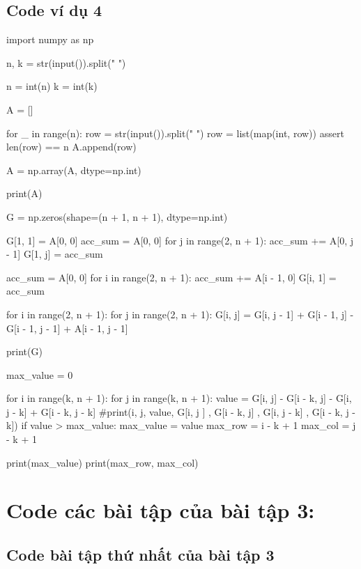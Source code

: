 \documentclass[14pt, a4paper]{article}
\theoremstyle{sltheorem}
\theoremstyle{soltheorem}
\begin{document}
    \subsection{Code ví dụ 4} \label{code-4-ex-2}

    \begin{python}
import numpy as np
        
n, k = str(input()).split(" ")
                    
n = int(n)
k = int(k)
                    
A = []
                    
for _ in range(n):
    row = str(input()).split(" ")
    row = list(map(int, row))
    assert len(row) == n
    A.append(row)
                    
A = np.array(A, dtype=np.int)
                    
print(A)
                    
G = np.zeros(shape=(n + 1, n + 1), dtype=np.int)
                    
G[1, 1] = A[0, 0]
acc_sum = A[0, 0]
for j in range(2, n + 1):
    acc_sum += A[0, j - 1]
    G[1, j] = acc_sum
                    
acc_sum = A[0, 0]
for i in range(2, n + 1):
    acc_sum += A[i - 1, 0]
    G[i, 1] = acc_sum
                    
for i in range(2, n + 1):
    for j in range(2, n + 1):
        G[i, j] = G[i, j - 1] + G[i - 1, j] - G[i - 1, j - 1] + A[i - 1, j - 1]
                    
                    
print(G)
                    
max_value = 0
                    
for i in range(k, n + 1):
    for j in range(k, n + 1):
        value = G[i, j] - G[i - k, j] - G[i, j - k] + G[i - k, j - k]
        #print(i, j, value, G[i, j ] , G[i - k, j] , G[i, j - k] , G[i - k, j - k])
        if value > max_value:
            max_value = value
            max_row = i - k + 1
            max_col = j - k + 1
                    
print(max_value)
print(max_row, max_col)
        \end{python}

\section{Code các bài tập của bài tập 3:}

\subsection{Code bài tập thứ nhất của bài tập 3} \label{code-1-ex-3}
\end{document}
